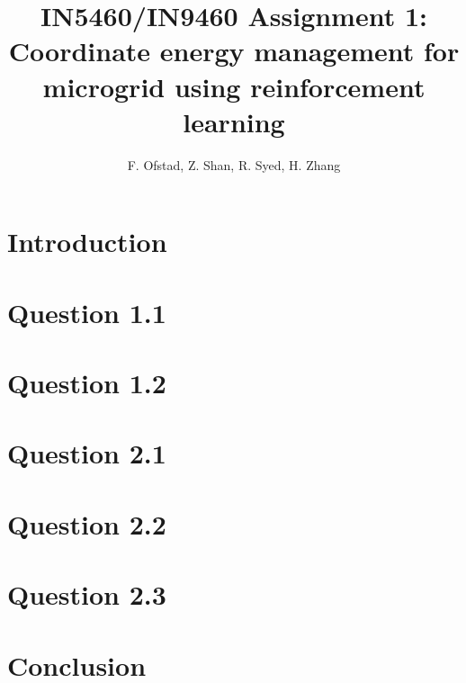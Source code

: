 \documentclass{article}
\title{\textbf{IN5460/IN9460 Assignment 1: Coordinate energy management for microgrid using reinforcement learning}}
\author{F. Ofstad, Z. Shan, R. Syed, H. Zhang}
\date{}
\begin{document}
\maketitle

\section{Introduction}

\section{Question 1.1}

\section{Question 1.2}

\section{Question 2.1}

\section{Question 2.2}

\section{Question 2.3}

\section{Conclusion}



\vspace*{10mm}
\end{document}
